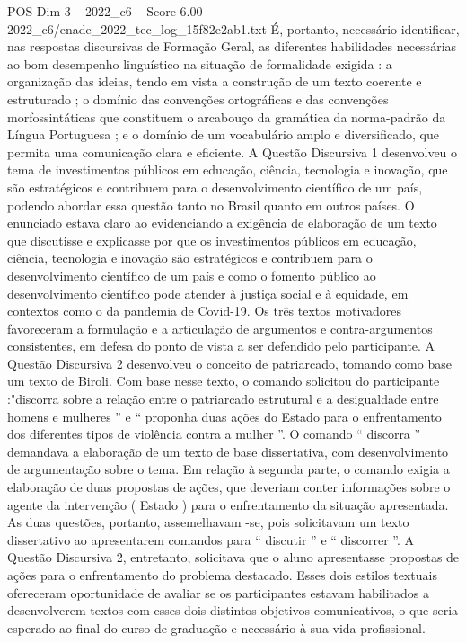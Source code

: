 \begin{textsample}{POS Dim 3 – 2022\_c6 – Score 6.00 – 2022\_c6/enade\_2022\_tec\_log\_15f82e2ab1.txt}
É, portanto, necessário identificar, nas respostas discursivas de Formação Geral, as diferentes habilidades necessárias ao bom desempenho linguístico na situação de formalidade exigida : a organização das ideias, tendo em vista a construção de um texto coerente e estruturado ; o domínio das convenções ortográficas e das convenções morfossintáticas que constituem o arcabouço da gramática da norma-padrão da Língua Portuguesa ; e o domínio de um vocabulário amplo e diversificado, que permita uma comunicação clara e eficiente.
A Questão Discursiva 1 desenvolveu o tema de investimentos públicos em educação, ciência, tecnologia e inovação, que são estratégicos e contribuem para o desenvolvimento científico de um país, podendo abordar essa questão tanto no Brasil quanto em outros países.
O enunciado estava claro ao evidenciando a exigência de elaboração de um texto que discutisse e explicasse por que os investimentos públicos em educação, ciência, tecnologia e inovação são estratégicos e contribuem para o desenvolvimento científico de um país e como o fomento público ao desenvolvimento científico pode atender à justiça social e à equidade, em contextos como o da pandemia de Covid-19.
Os três textos motivadores favoreceram a formulação e a articulação de argumentos e contra-argumentos consistentes, em defesa do ponto de vista a ser defendido pelo participante.
A Questão Discursiva 2 desenvolveu o conceito de patriarcado, tomando como base um texto de Biroli.
Com base nesse texto, o comando solicitou do participante :"discorra sobre a relação entre o patriarcado estrutural e a desigualdade entre homens e mulheres ” e “ proponha duas ações do Estado para o enfrentamento dos diferentes tipos de violência contra a mulher ”.
O comando “ discorra ” demandava a elaboração de um texto de base dissertativa, com desenvolvimento de argumentação sobre o tema.
Em relação à segunda parte, o comando exigia a elaboração de duas propostas de ações, que deveriam conter informações sobre o agente da intervenção ( Estado ) para o enfrentamento da situação apresentada.
As duas questões, portanto, assemelhavam -se, pois solicitavam um texto dissertativo ao apresentarem comandos para “ discutir ” e “ discorrer ”.
A Questão Discursiva 2, entretanto, solicitava que o aluno apresentasse propostas de ações para o enfrentamento do problema destacado.
Esses dois estilos textuais ofereceram oportunidade de avaliar se os participantes estavam habilitados a desenvolverem textos com esses dois distintos objetivos comunicativos, o que seria esperado ao final do curso de graduação e necessário à sua vida profissional.

\end{textsample}
